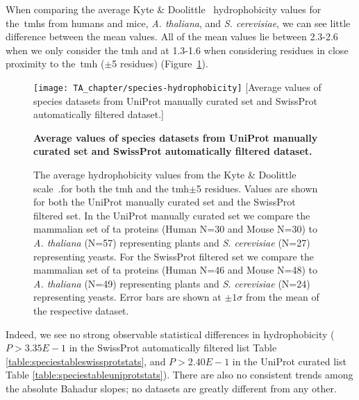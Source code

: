 When comparing the average Kyte \& Doolittle~\cite{Kyte1982} hydrophobicity values for the~\gls{tmh}s from humans and mice, \textit{A. thaliana}, and  \textit{S. cerevisiae}, we can see little difference between the mean values.
All of the mean values lie between 2.3-2.6 when we only consider the \gls{tmh} and at 1.3-1.6 when considering residues in close proximity to the~\gls{tmh} ($\pm$5 residues) (Figure~\ref{fig:average_species_hydrophobicity_ta}).

\begin{figure}[!ht]
\centering
\texttt{[image: TA\_chapter/species-hydrophobicity]}
[Average values of species datasets from UniProt manually curated set and SwissProt automatically filtered dataset.]
{\textbf{Average values of species datasets from UniProt manually curated set and SwissProt automatically filtered dataset.}

The average hydrophobicity values from the Kyte \& Doolittle scale~\cite{Kyte1982}.for both the \gls{tmh} and the \gls{tmh}$\pm$5 residues.
Values are shown for both the UniProt manually curated set and the SwissProt filtered set. In the UniProt manually curated set we compare the mammalian set of \gls{ta} proteins (Human N=30 and Mouse N=30) to \textit{A. thaliana} (N=57) representing plants and \textit{S. cerevisiae} (N=27) representing yeasts. For the SwissProt filtered set we compare the mammalian set of \gls{ta} proteins (Human N=46 and Mouse N=48) to \textit{A. thaliana} (N=49) representing plants  and  \textit{S. cerevisiae} (N=24) representing yeasts.
Error bars are shown at $\pm 1 \sigma$ from the mean of the respective dataset.
}

\label{fig:average_species_hydrophobicity_ta}
\end{figure}

Indeed, we see no strong observable statistical differences in hydrophobicity ($P>3.35E-1$ in the SwissProt automatically filtered list Table \ref{table:speciestableswissprotstats}, and $P>2.40E-1$ in the UniProt curated list Table \ref{table:speciestableuniprotstats}).
There are also no consistent trends among the absolute Bahadur slopes; no datasets are greatly different from any other.


